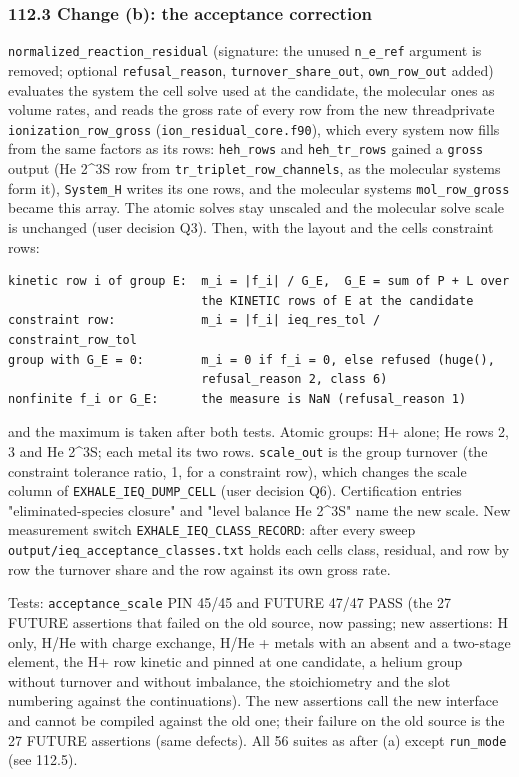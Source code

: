\documentclass[english,a4paper]{my_memo}
\begin{document}
\subsubsection{112.3 Change (b): the acceptance correction}\label{1123-change-b-the-acceptance-correction}

\texttt{normalized\_reaction\_residual} (signature: the unused \texttt{n\_e\_ref} argument is
removed; optional \texttt{refusal\_reason}, \texttt{turnover\_share\_out}, \texttt{own\_row\_out}
added) evaluates the system the cell solve used at the candidate, the
molecular ones as volume rates, and reads the gross rate of every row from
the new threadprivate \texttt{ionization\_row\_gross} (\texttt{ion\_residual\_core.f90}), which
every system now fills from the same factors as its rows: \texttt{heh\_rows} and
\texttt{heh\_tr\_rows} gained a \texttt{gross} output (He 2\^{}3S row from
\texttt{tr\_triplet\_row\_channels}, as the molecular systems form it), \texttt{System\_H}
writes its one row\textquotesingle s, and the molecular systems\textquotesingle{} \texttt{mol\_row\_gross} became this
array. The atomic solves stay unscaled and the molecular solve scale is
unchanged (user decision Q3). Then, with the layout and the cell\textquotesingle s
constraint rows:

\begin{verbatim}
kinetic row i of group E:  m_i = |f_i| / G_E,  G_E = sum of P + L over
                           the KINETIC rows of E at the candidate
constraint row:            m_i = |f_i| ieq_res_tol / constraint_row_tol
group with G_E = 0:        m_i = 0 if f_i = 0, else refused (huge(),
                           refusal_reason 2, class 6)
nonfinite f_i or G_E:      the measure is NaN (refusal_reason 1)
\end{verbatim}

and the maximum is taken after both tests. Atomic groups: H+ alone; He rows
2, 3 and He 2\^{}3S; each metal its two rows. \texttt{scale\_out} is the group turnover
(the constraint tolerance ratio, 1, for a constraint row), which changes the
scale column of \texttt{EXHALE\_IEQ\_DUMP\_CELL} (user decision Q6). Certification
entries "eliminated-species closure" and "level balance He 2\^{}3S" name the new
scale. New measurement switch \texttt{EXHALE\_IEQ\_CLASS\_RECORD}: after every sweep
\texttt{output/ieq\_acceptance\_classes.txt} holds each cell\textquotesingle s class, residual, and row
by row the turnover share and the row against its own gross rate.

Tests: \texttt{acceptance\_scale} PIN 45/45 and FUTURE 47/47 PASS (the 27 FUTURE
assertions that failed on the old source, now passing; new assertions:
H only, H/He with charge exchange, H/He + metals with an absent and a
two-stage element, the H+ row kinetic and pinned at one candidate, a helium
group without turnover and without imbalance, the stoichiometry and the slot
numbering against the continuation\textquotesingle s). The new assertions call the new
interface and cannot be compiled against the old one; their failure on the
old source is the 27 FUTURE assertions\textquotesingle{} (same defects). All 56 suites as
after (a) except \texttt{run\_mode} (see 112.5).
\end{document}
